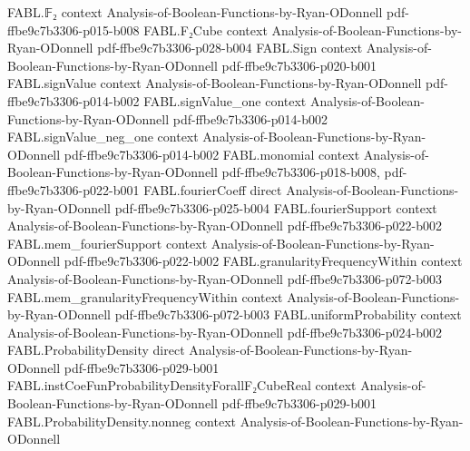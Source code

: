 \begin{theorem}
\label{FABL.densityConvolution_expectation_eq}
\leanok
{}
\proofstep
  {FABL.𝔽₂}
  {context}
  {Analysis-of-Boolean-Functions-by-Ryan-ODonnell}
  {pdf-ffbe9c7b3306-p015-b008}
\proofstep
  {FABL.F₂Cube}
  {context}
  {Analysis-of-Boolean-Functions-by-Ryan-ODonnell}
  {pdf-ffbe9c7b3306-p028-b004}
\proofstep
  {FABL.Sign}
  {context}
  {Analysis-of-Boolean-Functions-by-Ryan-ODonnell}
  {pdf-ffbe9c7b3306-p020-b001}
\proofstep
  {FABL.signValue}
  {context}
  {Analysis-of-Boolean-Functions-by-Ryan-ODonnell}
  {pdf-ffbe9c7b3306-p014-b002}
\proofstep
  {FABL.signValue_one}
  {context}
  {Analysis-of-Boolean-Functions-by-Ryan-ODonnell}
  {pdf-ffbe9c7b3306-p014-b002}
\proofstep
  {FABL.signValue_neg_one}
  {context}
  {Analysis-of-Boolean-Functions-by-Ryan-ODonnell}
  {pdf-ffbe9c7b3306-p014-b002}
\proofstep
  {FABL.monomial}
  {context}
  {Analysis-of-Boolean-Functions-by-Ryan-ODonnell}
  {pdf-ffbe9c7b3306-p018-b008,
    pdf-ffbe9c7b3306-p022-b001}
\proofstep
  {FABL.fourierCoeff}
  {direct}
  {Analysis-of-Boolean-Functions-by-Ryan-ODonnell}
  {pdf-ffbe9c7b3306-p025-b004}
\proofstep
  {FABL.fourierSupport}
  {context}
  {Analysis-of-Boolean-Functions-by-Ryan-ODonnell}
  {pdf-ffbe9c7b3306-p022-b002}
\proofstep
  {FABL.mem_fourierSupport}
  {context}
  {Analysis-of-Boolean-Functions-by-Ryan-ODonnell}
  {pdf-ffbe9c7b3306-p022-b002}
\proofstep
  {FABL.granularityFrequencyWithin}
  {context}
  {Analysis-of-Boolean-Functions-by-Ryan-ODonnell}
  {pdf-ffbe9c7b3306-p072-b003}
\proofstep
  {FABL.mem_granularityFrequencyWithin}
  {context}
  {Analysis-of-Boolean-Functions-by-Ryan-ODonnell}
  {pdf-ffbe9c7b3306-p072-b003}
\proofstep
  {FABL.uniformProbability}
  {context}
  {Analysis-of-Boolean-Functions-by-Ryan-ODonnell}
  {pdf-ffbe9c7b3306-p024-b002}
\proofstep
  {FABL.ProbabilityDensity}
  {direct}
  {Analysis-of-Boolean-Functions-by-Ryan-ODonnell}
  {pdf-ffbe9c7b3306-p029-b001}
\proofstep
  {FABL.instCoeFunProbabilityDensityForallF₂CubeReal}
  {context}
  {Analysis-of-Boolean-Functions-by-Ryan-ODonnell}
  {pdf-ffbe9c7b3306-p029-b001}
\proofstep
  {FABL.ProbabilityDensity.nonneg}
  {context}
  {Analysis-of-Boolean-Functions-by-Ryan-ODonnell}

\end{theorem}
